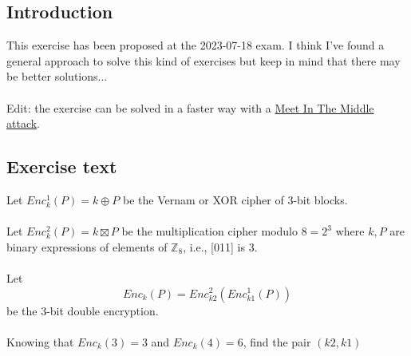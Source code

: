 \documentclass[11pt, a4paper]{article}
\begin{document}
\subsection{Introduction}
This exercise has been proposed at the 2023-07-18 exam. I think I've found a general approach to solve this kind of exercises but keep in mind that there may be better solutions...\\\\
Edit: the exercise can be solved in a faster way with a \textcolor{blue}{\hyperlink{link1}{Meet In The Middle attack}}.

\subsection{Exercise text}
Let $Enc_k^1(P)=k\oplus P$ be the Vernam or XOR cipher of 3-bit blocks.\\\\
Let $Enc_k^2(P)=k\boxtimes P$ be the multiplication cipher modulo $8=2^3$ where $k,P$ are binary expressions of elements of $\mathbb{Z}_8$, i.e., [011] is 3.\\\\
Let $$Enc_k(P)=Enc^2_{k2}\left(Enc_{k1}^1(P)\right)$$
be the 3-bit double encryption.\\\\
Knowing that $Enc_k(3)=3$ and $Enc_k(4)=6$, find the pair $(k2,k1)$
\end{document}
